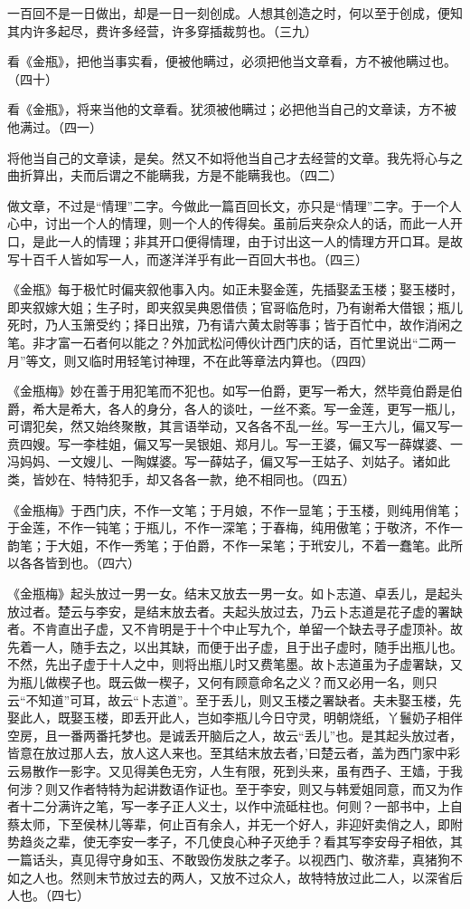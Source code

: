 {一百回不是一日做出，却是一日一刻创成。人想其创造之时，何以至于创成，便知其内许多起尽，费许多经营，许多穿插裁剪也。（三九）

看《金瓶》，把他当事实看，便被他瞒过，必须把他当文章看，方不被他瞒过也。（四十）

看《金瓶》，将来当他的文章看。犹须被他瞒过；必把他当自己的文章读，方不被他满过。（四一）

将他当自己的文章读，是矣。然又不如将他当自己才去经营的文章。我先将心与之曲折算出，夫而后谓之不能瞒我，方是不能瞒我也。（四二）

做文章，不过是“情理”二字。今做此一篇百回长文，亦只是“情理”二字。于一个人心中，讨出一个人的情理，则一个人的传得矣。虽前后夹杂众人的话，而此一人开口，是此一人的情理；非其开口便得情理，由于讨出这一人的情理方开口耳。是故写十百千人皆如写一人，而遂洋洋乎有此一百回大书也。（四三）

《金瓶》每于极忙时偏夹叙他事入内。如正未娶金莲，先插娶孟玉楼；娶玉楼时，即夹叙嫁大姐；生子时，即夹叙吴典恩借债；官哥临危时，乃有谢希大借银；瓶儿死时，乃人玉箫受约；择日出殡，乃有请六黄太尉等事；皆于百忙中，故作消闲之笔。非才富一石者何以能之？外加武松问傅伙计西门庆的话，百忙里说出“二两一月”等文，则又临时用轻笔讨神理，不在此等章法内算也。（四四）

《金瓶梅》妙在善于用犯笔而不犯也。如写一伯爵，更写一希大，然毕竟伯爵是伯爵，希大是希大，各人的身分，各人的谈吐，一丝不紊。写一金莲，更写一瓶儿，可谓犯矣，然又始终聚散，其言语举动，又各各不乱一丝。写一王六儿，偏又写一贲四嫂。写一李桂姐，偏又写一吴银姐、郑月儿。写一王婆，偏又写一薛媒婆、一冯妈妈、一文嫂儿、一陶媒婆。写一薛姑子，偏又写一王姑子、刘姑子。诸如此类，皆妙在、特特犯手，却又各各一款，绝不相同也。（四五）

《金瓶梅》于西门庆，不作一文笔；于月娘，不作一显笔；于玉楼，则纯用俏笔；于金莲，不作一钝笔；于瓶儿，不作一深笔；于春梅，纯用傲笔；于敬济，不作一韵笔；于大姐，不作一秀笔；于伯爵，不作一呆笔；于玳安儿，不着一蠢笔。此所以各各皆到也。（四六）

《金瓶梅》起头放过一男一女。结末又放去一男一女。如卜志道、卓丢儿，是起头放过者。楚云与李安，是结末放去者。夫起头放过去，乃云卜志道是花子虚的署缺者。不肯直出子虚，又不肯明是于十个中止写九个，单留一个缺去寻子虚顶补。故先着一人，随手去之，以出其缺，而便于出子虚，且于出子虚时，随手出瓶儿也。不然，先出子虚于十人之中，则将出瓶儿时又费笔墨。故卜志道虽为子虚署缺，又为瓶儿做楔子也。既云做一楔子，又何有顾意命名之义？而又必用一名，则只云“不知道”可耳，故云“卜志道”。至于丢儿，则又玉楼之署缺者。夫未娶玉楼，先娶此人，既娶玉楼，即丢开此人，岂如李瓶儿今日守灵，明朝烧纸，丫鬟奶子相伴空房，且一番两番托梦也。是诚丢开脑后之人，故云“丢儿”也。是其起头放过者，皆意在放过那人去，放人这人来也。至其结末放去者，’曰楚云者，盖为西门家中彩云易散作一影字。又见得美色无穷，人生有限，死到头来，虽有西子、王嫱，于我何涉？则又作者特特为起讲数语作证也。至于李安，则又与韩爱姐同意，而又为作者十二分满许之笔，写一孝子正人义士，以作中流砥柱也。何则？一部书中，上自蔡太师，下至侯林儿等辈，何止百有余人，并无一个好人，非迎奸卖俏之人，即附势趋炎之辈，使无李安一孝子，不几使良心种子灭绝手？看其写李安母子相依，其一篇话头，真见得守身如玉、不敢毁伤发肤之孝子。以视西门、敬济辈，真猪狗不如之人也。然则末节放过去的两人，又放不过众人，故特特放过此二人，以深省后人也。（四七）

}
